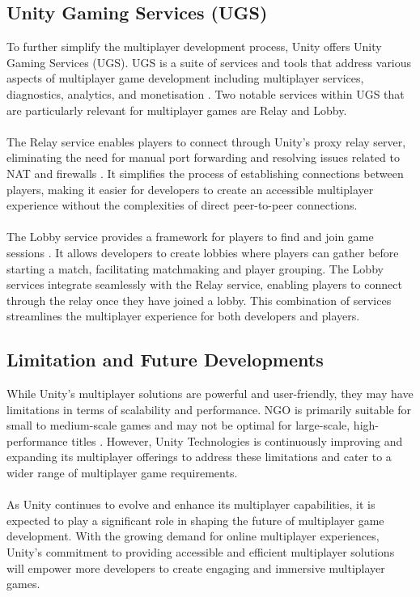 \subsection{Unity Gaming Services (UGS)}
To further simplify the multiplayer development process, Unity offers Unity Gaming Services (UGS). UGS is a suite of services and tools that address various aspects of multiplayer game development including multiplayer services, diagnostics, analytics, and monetisation \cite{Unity-UGS}. Two notable services within UGS that are particularly relevant for multiplayer games are Relay and Lobby.
\\
\noindent
\\
The Relay service enables players to connect through Unity's proxy relay server, eliminating the need for manual port forwarding and resolving issues related to NAT and firewalls \cite{Cardoso-Relay}. It simplifies the process of establishing connections between players, making it easier for developers to create an accessible multiplayer experience without the complexities of direct peer-to-peer connections.
\\
\noindent
\\
The Lobby service provides a framework for players to find and join game sessions \cite{Cardoso-Lobby}. It allows developers to create lobbies where players can gather before starting a match, facilitating matchmaking and player grouping. The Lobby services integrate seamlessly with the Relay service, enabling players to connect through the relay once they have joined a lobby. This combination of services streamlines the multiplayer experience for both developers and players.

\subsection{Limitation and Future Developments}
While Unity's multiplayer solutions are powerful and user-friendly, they may have limitations in terms of scalability and performance. NGO is primarily suitable for small to medium-scale games and may not be optimal for large-scale, high-performance titles \cite{lemay-forum}. However, Unity Technologies is continuously improving and expanding its multiplayer offerings to address these limitations and cater to a wider range of multiplayer game requirements.
\\
\noindent
\\
As Unity continues to evolve and enhance its multiplayer capabilities, it is expected to play a significant role in shaping the future of multiplayer game development. With the growing demand for online multiplayer experiences, Unity's commitment to providing accessible and efficient multiplayer solutions will empower more developers to create engaging and immersive multiplayer games.

